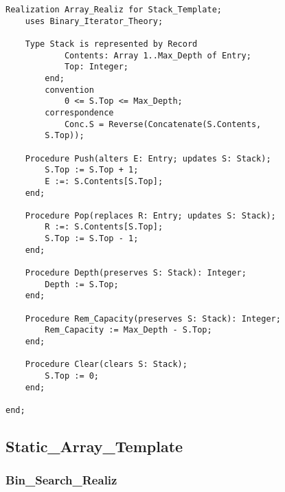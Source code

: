 \begin{lstlisting}[language=resolve]
Realization Array_Realiz for Stack_Template;
	uses Binary_Iterator_Theory;

    Type Stack is represented by Record
            Contents: Array 1..Max_Depth of Entry;
            Top: Integer;
        end;
        convention
            0 <= S.Top <= Max_Depth;
        correspondence
            Conc.S = Reverse(Concatenate(S.Contents, 
		S.Top));

    Procedure Push(alters E: Entry; updates S: Stack);
        S.Top := S.Top + 1;
        E :=: S.Contents[S.Top];
    end;

    Procedure Pop(replaces R: Entry; updates S: Stack); 
        R :=: S.Contents[S.Top];
        S.Top := S.Top - 1;
    end;

    Procedure Depth(preserves S: Stack): Integer;
        Depth := S.Top;
    end;

    Procedure Rem_Capacity(preserves S: Stack): Integer;
        Rem_Capacity := Max_Depth - S.Top;
    end;

    Procedure Clear(clears S: Stack);
        S.Top := 0;
    end;

end;
\end{lstlisting}

	\subsection{Static\_Array\_Template}	%

		\subsubsection{Bin\_Search\_Realiz}	%

